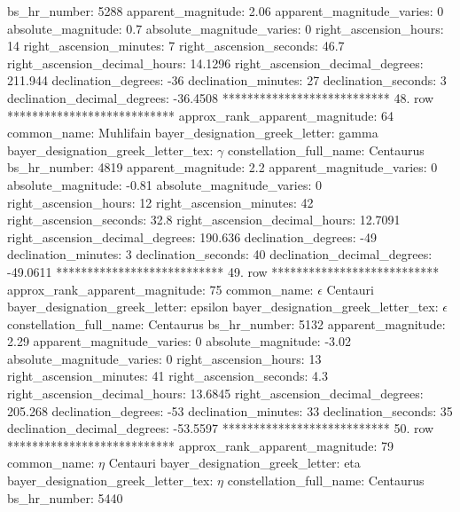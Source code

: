                       bs_hr_number: 5288
                apparent_magnitude: 2.06
         apparent_magnitude_varies: 0
                absolute_magnitude: 0.7
         absolute_magnitude_varies: 0
             right_ascension_hours: 14
           right_ascension_minutes: 7
           right_ascension_seconds: 46.7
     right_ascension_decimal_hours: 14.1296
   right_ascension_decimal_degrees: 211.944
               declination_degrees: -36
               declination_minutes: 27
               declination_seconds: 3
       declination_decimal_degrees: -36.4508
*************************** 48. row ***************************
    approx_rank_apparent_magnitude: 64
                       common_name: Muhlifain
    bayer_designation_greek_letter: gamma
bayer_designation_greek_letter_tex: $\gamma$
           constellation_full_name: Centaurus
                      bs_hr_number: 4819
                apparent_magnitude: 2.2
         apparent_magnitude_varies: 0
                absolute_magnitude: -0.81
         absolute_magnitude_varies: 0
             right_ascension_hours: 12
           right_ascension_minutes: 42
           right_ascension_seconds: 32.8
     right_ascension_decimal_hours: 12.7091
   right_ascension_decimal_degrees: 190.636
               declination_degrees: -49
               declination_minutes: 3
               declination_seconds: 40
       declination_decimal_degrees: -49.0611
*************************** 49. row ***************************
    approx_rank_apparent_magnitude: 75
                       common_name: $\epsilon$ Centauri
    bayer_designation_greek_letter: epsilon
bayer_designation_greek_letter_tex: $\epsilon$
           constellation_full_name: Centaurus
                      bs_hr_number: 5132
                apparent_magnitude: 2.29
         apparent_magnitude_varies: 0
                absolute_magnitude: -3.02
         absolute_magnitude_varies: 0
             right_ascension_hours: 13
           right_ascension_minutes: 41
           right_ascension_seconds: 4.3
     right_ascension_decimal_hours: 13.6845
   right_ascension_decimal_degrees: 205.268
               declination_degrees: -53
               declination_minutes: 33
               declination_seconds: 35
       declination_decimal_degrees: -53.5597
*************************** 50. row ***************************
    approx_rank_apparent_magnitude: 79
                       common_name: $\eta$ Centauri
    bayer_designation_greek_letter: eta
bayer_designation_greek_letter_tex: $\eta$
           constellation_full_name: Centaurus
                      bs_hr_number: 5440
